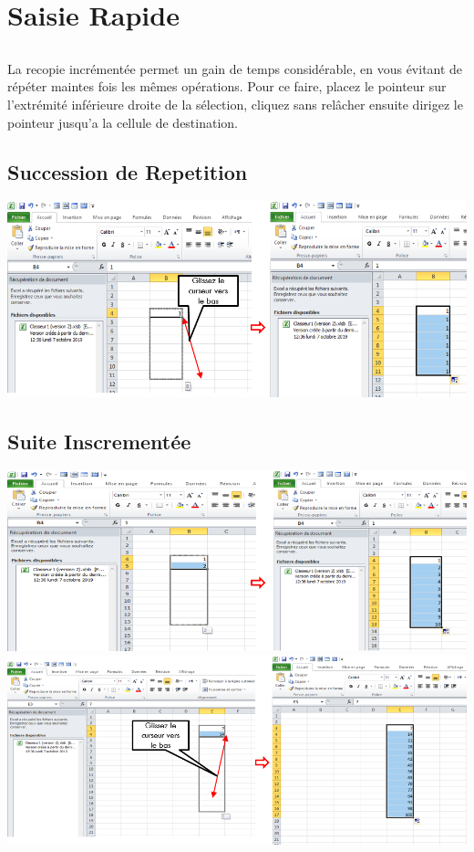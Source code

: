\chapter{Saisie Rapide}
\section*{}
La recopie incrémentée permet un gain de temps considérable, en vous évitant de répéter maintes fois les mêmes opérations. Pour ce faire, placez le pointeur sur l’extrémité inférieure droite de la sélection, cliquez sans 
relâcher ensuite dirigez le pointeur jusqu'a la cellule de destination.
\section{Succession de Repetition} 
\begin{center}  
	\includegraphics[scale=0.2,width=0.9 \linewidth]{img/saisi_rapide1} 
\end{center}
\section{Suite Inscrementée}
\begin{center}  
	\includegraphics[scale=0.2,width= \linewidth]{img/saisi_rapide2}
	\includegraphics[scale=0.2,width= \linewidth]{img/saisi_rapide3}
\end{center}

